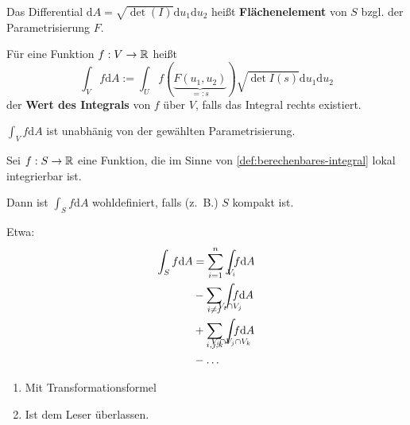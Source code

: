 \begin{definition}%
    \begin{defenum}
        \item Das Differential $\mathrm{d} A = \sqrt{\det (I)} \mathrm{d} u_1 \mathrm{d} u_2$
              heißt \textbf{Flächenelement} von $S$ bzgl. der Parametrisierung $F$.
        \item \label{def:berechenbares-integral}Für eine Funktion $f: V \rightarrow \mathbb{R}$ heißt 
              \[\int_V f \mathrm{d} A := \int_U f(\underbrace{F(u_1, u_2)}_{=: s}) \sqrt{\det I(s)} \mathrm{d} u_1 \mathrm{d} u_2\]
              der \textbf{Wert des Integrals} von $f$ über $V$, falls das Integral rechts
              existiert.
    \end{defenum}

\end{definition}

\begin{bemerkung}
    \begin{bemenum}
        \item $\int_V f \mathrm{d} A$ ist unabhänig von der gewählten Parametrisierung.
        \item Sei $f: S \rightarrow \mathbb{R}$ eine Funktion, die im Sinne von
              \cref{def:berechenbares-integral} lokal integrierbar ist.

              Dann ist $\int_S f \mathrm{d} A$ wohldefiniert, falls (z.~B.) $S$
              kompakt ist.

              Etwa:
              \begin{align*}
                \int_S f \mathrm{d} A &= \sum_{i=1}^n \int_{\mathclap{V_i}} f \mathrm{d} A \\
                &- \sum_{i \neq j} \int_{\mathclap{V_i \cap V_j}} f \mathrm{d} A \\
                &+ \sum_{i,j,k} \int_{\mathclap{V_i \cap V_j \cap V_k}} f \mathrm{d} A\\
                &- \dots
              \end{align*}
    \end{bemenum}
\end{bemerkung}

\begin{beweis}\leavevmode
    \begin{enumerate}[label=\alph*)]
        \item Mit Transformationsformel
        \item Ist dem Leser überlassen.
    \end{enumerate}
\end{beweis}


